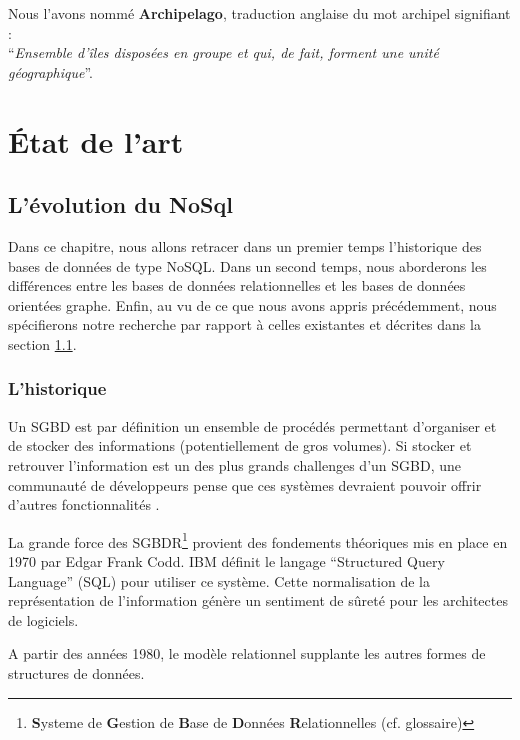 \documentclass[a4paper,fleqn,12pt,oneside]{book}
\begin{document}
\begin{center}
Nous l'avons nommé \textbf{Archipelago}, traduction anglaise du mot archipel signifiant : \\ \enquote{\textit{Ensemble d'îles disposées en groupe et qui, de fait, forment une unité géographique}}\cite{linternaute}.
\end{center}
 
\part{État de l'art}

\chapter{L'évolution du NoSql}

Dans ce chapitre, nous allons retracer dans un premier temps l'historique des bases de données de type NoSQL. Dans un second temps, nous aborderons les différences entre les bases de données relationnelles et les bases de données orientées graphe. Enfin, au vu de ce que nous avons appris précédemment, nous spécifierons notre recherche par rapport à celles existantes et décrites dans la section \ref{NoSqlEvol}.

\section{L'historique}
\label{NoSqlEvol}

Un SGBD est par définition un ensemble de procédés permettant d'organiser et de stocker des informations (potentiellement de gros volumes). Si stocker et retrouver l'information est un des plus grands challenges d'un SGBD, une communauté de développeurs pense que ces systèmes devraient pouvoir offrir d'autres fonctionnalités \cite{coupaye1998modeles}.

La grande force des SGBDR\footnote{\textbf{S}ysteme de \textbf{G}estion de \textbf{B}ase de \textbf{D}onnées 
\textbf{R}elationnelles (cf. glossaire)} provient des fondements théoriques mis en place en 1970 par Edgar Frank Codd. IBM définit le langage \enquote{Structured Query Language} (SQL) pour utiliser ce système. Cette normalisation de la représentation de l'information génère un sentiment de sûreté pour les architectes de logiciels\cite{bruchez2016bases}.
 
A partir des années 1980, le modèle relationnel supplante les autres formes de structures de données.
\end{document}
